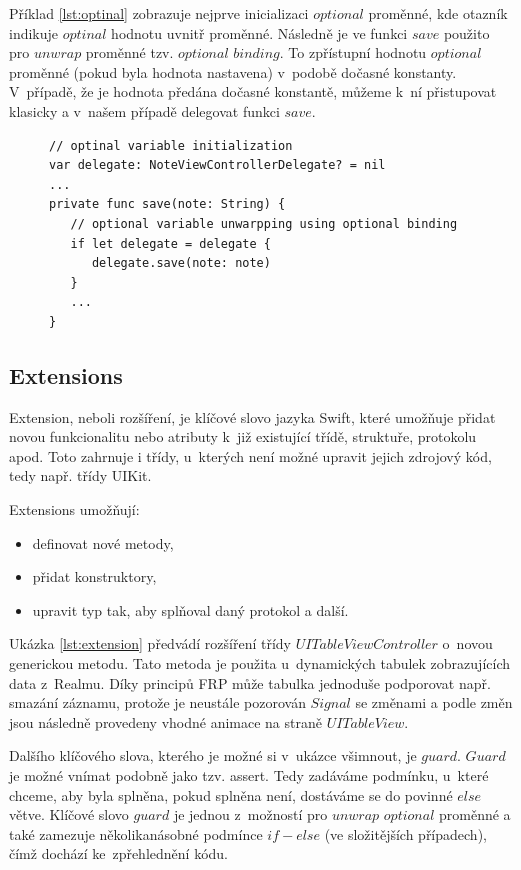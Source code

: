 \documentclass[thesis=M,czech]{FITthesis}[2012/06/26]
\begin{document}
Příklad \ref{lst:optinal} zobrazuje nejprve inicializaci $optional$ proměnné, kde otazník indikuje $optinal$ hodnotu uvnitř proměnné. Následně je ve funkci $save$ použito pro $unwrap$ proměnné tzv. $optional$ $binding$. To zpřístupní hodnotu $optional$ proměnné (pokud byla hodnota nastavena) v~podobě dočasné konstanty. V~případě, že je hodnota předána dočasné konstantě, můžeme k~ní přistupovat klasicky a v~našem případě delegovat funkci $save$.

\begin{figure}
\begin{minipage}{\linewidth}
\begin{lstlisting}[caption={Příklad práce s~Optinal},label={lst:optinal}]
// optinal variable initialization
var delegate: NoteViewControllerDelegate? = nil
...
private func save(note: String) {
   // optional variable unwarpping using optional binding
   if let delegate = delegate {
      delegate.save(note: note)
   }
   ...
}

\end{lstlisting}
\end{minipage}
\end{figure}


\subsection{Extensions}
Extension, neboli rozšíření, je klíčové slovo jazyka Swift, které umožňuje přidat novou funkcionalitu nebo atributy k~již existující třídě, struktuře, protokolu apod. Toto zahrnuje i třídy, u~kterých není možné upravit jejich zdrojový kód, tedy např. třídy UIKit.

Extensions umožňují: 
\begin{itemize}
	\item definovat nové metody,
	\item přidat konstruktory, 
	\item upravit typ tak, aby splňoval daný protokol a další. \cite{devExtensions}
\end{itemize}

Ukázka \ref{lst:extension} předvádí rozšíření třídy $UITableViewController$ o~novou generickou metodu. Tato metoda je použita u~dynamických tabulek zobrazujících data z~Realmu. Díky principů FRP může tabulka jednoduše podporovat např. smazání záznamu, protože je neustále pozorován $Signal$ se změnami a podle změn jsou následně provedeny vhodné animace na straně $UITableView$.

Dalšího klíčového slova, kterého je možné si v~ukázce všimnout, je $guard$. $Guard$ je možné vnímat podobně jako tzv. assert. Tedy zadáváme podmínku, u~které chceme, aby byla splněna, pokud splněna není, dostáváme se do povinné $else$ větve. Klíčové slovo $guard$ je jednou z~možností pro $unwrap$ $optional$ proměnné a také zamezuje několikanásobné podmínce $if-else$ (ve složitějších případech), čímž dochází ke~zpřehlednění kódu. \cite{devGuard}
\end{document}
